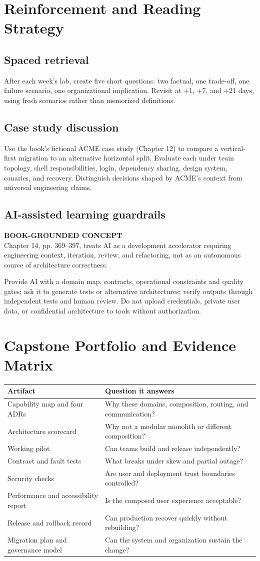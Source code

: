 \documentclass[11pt,letterpaper,oneside]{report}
\newcommand{\based}[1]{\begin{sourcebox}\textbf{BOOK-GROUNDED CONCEPT}\\#1\end{sourcebox}}
\begin{document}
\chapter{Reinforcement and Reading Strategy}
\section{Spaced retrieval}
After each week's lab, create five short questions: two factual, one trade-off, one failure scenario, one organizational implication. Revisit at +1, +7, and +21 days, using fresh scenarios rather than memorized definitions.
\section{Case study discussion}
Use the book's fictional ACME case study (Chapter 12) to compare a vertical-first migration to an alternative horizontal split. Evaluate each under team topology, shell responsibilities, login, dependency sharing, design system, canaries, and recovery. Distinguish decisions shaped by ACME's context from universal engineering claims.
\section{AI-assisted learning guardrails}
\based{Chapter 14, pp. 369--397, treats AI as a development accelerator requiring engineering context, iteration, review, and refactoring, not as an autonomous source of architecture correctness.}
Provide AI with a domain map, contracts, operational constraints and quality gates; ask it to generate tests or alternative architectures; verify outputs through independent tests and human review. Do not upload credentials, private user data, or confidential architecture to tools without authorization.
\chapter{Capstone Portfolio and Evidence Matrix}
\begin{longtable}{>{\raggedright\arraybackslash}p{.29\linewidth}>{\raggedright\arraybackslash}p{.57\linewidth}}\toprule Artifact & Question it answers \\\midrule
Capability map and four ADRs & Why these domains, composition, routing, and communication?\\
Architecture scorecard & Why not a modular monolith or different composition?\\
Working pilot & Can teams build and release independently?\\
Contract and fault tests & What breaks under skew and partial outage?\\
Security checks & Are user and deployment trust boundaries controlled?\\
Performance and accessibility report & Is the composed user experience acceptable?\\
Release and rollback record & Can production recover quickly without rebuilding?\\
Migration plan and governance model & Can the system and organization sustain the change?\\\bottomrule\end{longtable}
\end{document}
